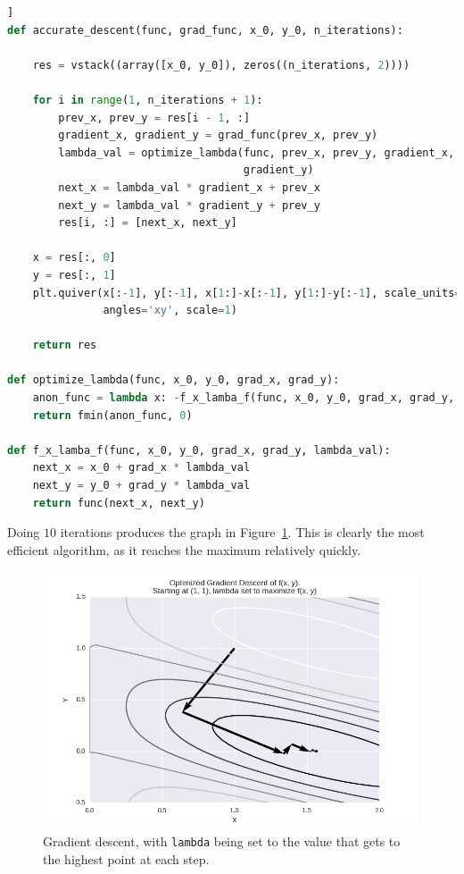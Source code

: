 \documentclass[]{article}
\begin{document}
\begin{lstlisting}[language=Python, frame=single]]
def accurate_descent(func, grad_func, x_0, y_0, n_iterations):

    res = vstack((array([x_0, y_0]), zeros((n_iterations, 2))))

    for i in range(1, n_iterations + 1):
        prev_x, prev_y = res[i - 1, :]
        gradient_x, gradient_y = grad_func(prev_x, prev_y)
        lambda_val = optimize_lambda(func, prev_x, prev_y, gradient_x,
                                     gradient_y)
        next_x = lambda_val * gradient_x + prev_x
        next_y = lambda_val * gradient_y + prev_y
        res[i, :] = [next_x, next_y]

    x = res[:, 0]
    y = res[:, 1]
    plt.quiver(x[:-1], y[:-1], x[1:]-x[:-1], y[1:]-y[:-1], scale_units='xy',
               angles='xy', scale=1)

    return res

def optimize_lambda(func, x_0, y_0, grad_x, grad_y):
    anon_func = lambda x: -f_x_lamba_f(func, x_0, y_0, grad_x, grad_y, x)
    return fmin(anon_func, 0)

def f_x_lamba_f(func, x_0, y_0, grad_x, grad_y, lambda_val):
    next_x = x_0 + grad_x * lambda_val
    next_y = y_0 + grad_y * lambda_val
    return func(next_x, next_y)
\end{lstlisting}

Doing $10$ iterations produces the graph in Figure~\ref{fig:lambdaopt}. This is clearly the most efficient algorithm, as it reaches the maximum relatively quickly.

\begin{figure}
\centering
\includegraphics[height=3in]{../img/optimized_gradient.png}
\caption{Gradient descent, with \texttt{lambda} being set to the value that gets to the highest point at each step.}
\label{fig:lambdaopt}
\end{figure}
\end{document}

